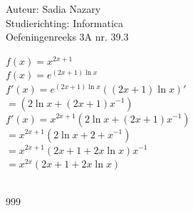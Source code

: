 \documentclass[a4paper]{article}
\begin{document}
  
\noindent \large Auteur: Sadia Nazary  \\
\noindent \large Studierichting: Informatica\\
\noindent \large Oefeningenreeks 3A nr. 39.3\\

\medskip

\normalsize

$f(x)=x^{2x+1}$ \\

$f(x)=e^{(2x+1)\ln x}$ \\

$f'(x)=e^{(2x+1)\ln x}((2x+1)\ln x)'$ \\

$=(2\ln x+(2x+1)x^{-1})$ \\

$f'(x)=x^{2x+1}(2\ln x+(2x+1)x^{-1})$ \\

$=x^{2x+1}(2\ln x+2+x^{-1})$ \\

$=x^{2x+1}(2x+1+2x\ln x)x^{-1}$ \\

$=x^{2x}(2x+1+2x\ln x)$ \\

 \\

\begin{thebibliography}{999}
\end{thebibliography}
\end{document}
